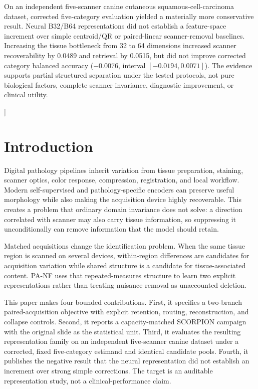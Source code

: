 \documentclass[10pt]{article}
\begin{document}
{\begin{center}
\begin{minipage}{0.92\textwidth}
On an independent five-scanner canine cutaneous squamous-cell-carcinoma dataset, corrected five-category evaluation yielded a materially more conservative result. Neural B32/B64 representations did not establish a feature-space increment over simple centroid/QR or paired-linear scanner-removal baselines. Increasing the tissue bottleneck from 32 to 64 dimensions increased scanner recoverability by 0.0489 and retrieval by 0.0515, but did not improve corrected category balanced accuracy ($-0.0076$, interval $[-0.0194,0.0071]$). The evidence supports partial structured separation under the tested protocols, not pure biological factors, complete scanner invariance, diagnostic improvement, or clinical utility.
\end{minipage}
\end{center}
\vspace{0.07in}
}]

\section{Introduction}
Digital pathology pipelines inherit variation from tissue preparation, staining, scanner optics, color response, compression, registration, and local workflow. Modern self-supervised and pathology-specific encoders can preserve useful morphology while also making the acquisition device highly recoverable. This creates a problem that ordinary domain invariance does not solve: a direction correlated with scanner may also carry tissue information, so suppressing it unconditionally can remove information that the model should retain.

Matched acquisitions change the identification problem. When the same tissue region is scanned on several devices, within-region differences are candidates for acquisition variation while shared structure is a candidate for tissue-associated content. PA-NF uses that repeated-measures structure to learn two explicit representations rather than treating nuisance removal as unaccounted deletion.

This paper makes four bounded contributions. First, it specifies a two-branch paired-acquisition objective with explicit retention, routing, reconstruction, and collapse controls. Second, it reports a capacity-matched SCORPION campaign with the original slide as the statistical unit. Third, it evaluates the resulting representation family on an independent five-scanner canine dataset under a corrected, fixed five-category estimand and identical candidate pools. Fourth, it publishes the negative result that the neural representation did not establish an increment over strong simple corrections. The target is an auditable representation study, not a clinical-performance claim.
\end{document}
